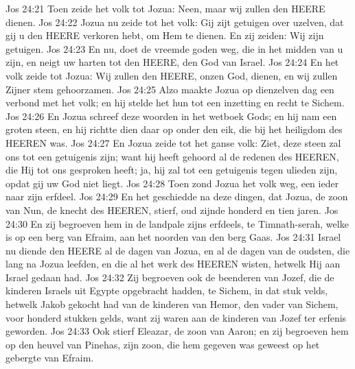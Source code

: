 Jos 24:21  Toen zeide het volk tot Jozua: Neen, maar wij zullen den HEERE dienen.
Jos 24:22  Jozua nu zeide tot het volk: Gij zijt getuigen over uzelven, dat gij u den HEERE verkoren hebt, om Hem te dienen. En zij zeiden: Wij zijn getuigen.
Jos 24:23  En nu, doet de vreemde goden weg, die in het midden van u zijn, en neigt uw harten tot den HEERE, den God van Israel.
Jos 24:24  En het volk zeide tot Jozua: Wij zullen den HEERE, onzen God, dienen, en wij zullen Zijner stem gehoorzamen.
Jos 24:25  Alzo maakte Jozua op dienzelven dag een verbond met het volk; en hij stelde het hun tot een inzetting en recht te Sichem.
Jos 24:26  En Jozua schreef deze woorden in het wetboek Gods; en hij nam een groten steen, en hij richtte dien daar op onder den eik, die bij het heiligdom des HEEREN was.
Jos 24:27  En Jozua zeide tot het ganse volk: Ziet, deze steen zal ons tot een getuigenis zijn; want hij heeft gehoord al de redenen des HEEREN, die Hij tot ons gesproken heeft; ja, hij zal tot een getuigenis tegen ulieden zijn, opdat gij uw God niet liegt.
Jos 24:28  Toen zond Jozua het volk weg, een ieder naar zijn erfdeel.
Jos 24:29  En het geschiedde na deze dingen, dat Jozua, de zoon van Nun, de knecht des HEEREN, stierf, oud zijnde honderd en tien jaren.
Jos 24:30  En zij begroeven hem in de landpale zijns erfdeels, te Timnath-serah, welke is op een berg van Efraim, aan het noorden van den berg Gaas.
Jos 24:31  Israel nu diende den HEERE al de dagen van Jozua, en al de dagen van de oudsten, die lang na Jozua leefden, en die al het werk des HEEREN wisten, hetwelk Hij aan Israel gedaan had.
Jos 24:32  Zij begroeven ook de beenderen van Jozef, die de kinderen Israels uit Egypte opgebracht hadden, te Sichem, in dat stuk velds, hetwelk Jakob gekocht had van de kinderen van Hemor, den vader van Sichem, voor honderd stukken gelds, want zij waren aan de kinderen van Jozef ter erfenis geworden.
Jos 24:33  Ook stierf Eleazar, de zoon van Aaron; en zij begroeven hem op den heuvel van Pinehas, zijn zoon, die hem gegeven was geweest op het gebergte van Efraim.




